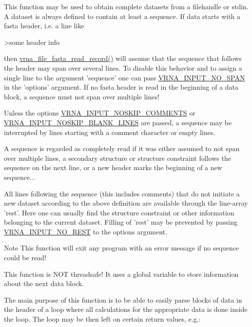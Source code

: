 This function may be used to obtain complete datasets from a filehandle or stdin. A dataset is always defined to contain at least a sequence. If data starts with a fasta header, i.\-e. a line like \begin{DoxyVerb}>some header info \end{DoxyVerb}
 then \hyperlink{group__file__utils_ga8cfb7e271efc9e1f34640acb85475639}{vrna\-\_\-file\-\_\-fasta\-\_\-read\-\_\-record()} will assume that the sequence that follows the header may span over several lines. To disable this behavior and to assign a single line to the argument 'sequence' one can pass \hyperlink{group__utils_ga0de536599b881c787b0943a2671da476}{V\-R\-N\-A\-\_\-\-I\-N\-P\-U\-T\-\_\-\-N\-O\-\_\-\-S\-P\-A\-N} in the 'options' argument. If no fasta header is read in the beginning of a data block, a sequence must not span over multiple lines!\par
 Unless the options \hyperlink{group__utils_ga0f6311f11bed1842e3a527ab27b294c6}{V\-R\-N\-A\-\_\-\-I\-N\-P\-U\-T\-\_\-\-N\-O\-S\-K\-I\-P\-\_\-\-C\-O\-M\-M\-E\-N\-T\-S} or \hyperlink{group__utils_gab4db885222b3b69608310d7c7e63e286}{V\-R\-N\-A\-\_\-\-I\-N\-P\-U\-T\-\_\-\-N\-O\-S\-K\-I\-P\-\_\-\-B\-L\-A\-N\-K\-\_\-\-L\-I\-N\-E\-S} are passed, a sequence may be interrupted by lines starting with a comment character or empty lines.\par
 A sequence is regarded as completely read if it was either assumed to not span over multiple lines, a secondary structure or structure constraint follows the sequence on the next line, or a new header marks the beginning of a new sequence...\par
 All lines following the sequence (this includes comments) that do not initiate a new dataset according to the above definition are available through the line-\/array 'rest'. Here one can usually find the structure constraint or other information belonging to the current dataset. Filling of 'rest' may be prevented by passing \hyperlink{group__utils_ga7a2e8c50a0c7ce82e60da1016e1367fd}{V\-R\-N\-A\-\_\-\-I\-N\-P\-U\-T\-\_\-\-N\-O\-\_\-\-R\-E\-S\-T} to the options argument.\par
 \begin{DoxyNote}{Note}
This function will exit any program with an error message if no sequence could be read! 

This function is N\-O\-T threadsafe! It uses a global variable to store information about the next data block.
\end{DoxyNote}
The main purpose of this function is to be able to easily parse blocks of data in the header of a loop where all calculations for the appropriate data is done inside the loop. The loop may be then left on certain return values, e.\-g.\-: 
